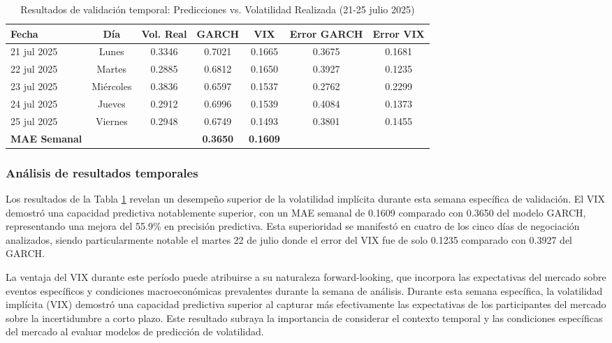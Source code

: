 \begin{table}[hbt!]
\centering
\caption{Resultados de validación temporal: Predicciones vs. Volatilidad Realizada (21-25 julio 2025)}
\begin{tabular}{lcccccc}
\hline
\textbf{Fecha} & \textbf{Día} & \textbf{Vol. Real} & \textbf{GARCH} & \textbf{VIX} & \textbf{Error GARCH} & \textbf{Error VIX} \\
\hline
21 jul 2025 & Lunes & 0.3346 & 0.7021 & 0.1665 & 0.3675 & 0.1681 \\
22 jul 2025 & Martes & 0.2885 & 0.6812 & 0.1650 & 0.3927 & 0.1235 \\
23 jul 2025 & Miércoles & 0.3836 & 0.6597 & 0.1537 & 0.2762 & 0.2299 \\
24 jul 2025 & Jueves & 0.2912 & 0.6996 & 0.1539 & 0.4084 & 0.1373 \\
25 jul 2025 & Viernes & 0.2948 & 0.6749 & 0.1493 & 0.3801 & 0.1455 \\
\hline
\textbf{MAE Semanal} & & & \textbf{0.3650} & \textbf{0.1609} & & \\
\hline
\end{tabular}
\label{tab:validacion_temporal}
\end{table}

\subsubsection{Análisis de resultados temporales}

Los resultados de la Tabla \ref{tab:validacion_temporal} revelan un desempeño superior de la volatilidad implícita durante esta semana específica de validación. El VIX demostró una capacidad predictiva notablemente superior, con un MAE semanal de 0.1609 comparado con 0.3650 del modelo GARCH, representando una mejora del 55.9\% en precisión predictiva. Esta superioridad se manifestó en cuatro de los cinco días de negociación analizados, siendo particularmente notable el martes 22 de julio donde el error del VIX fue de solo 0.1235 comparado con 0.3927 del GARCH.

La ventaja del VIX durante este período puede atribuirse a su naturaleza forward-looking, que incorpora las expectativas del mercado sobre eventos específicos y condiciones macroeconómicas prevalentes durante la semana de análisis. Durante esta semana específica, la volatilidad implícita (VIX) demostró una capacidad predictiva superior al capturar más efectivamente las expectativas de los participantes del mercado sobre la incertidumbre a corto plazo. Este resultado subraya la importancia de considerar el contexto temporal y las condiciones específicas del mercado al evaluar modelos de predicción de volatilidad.

